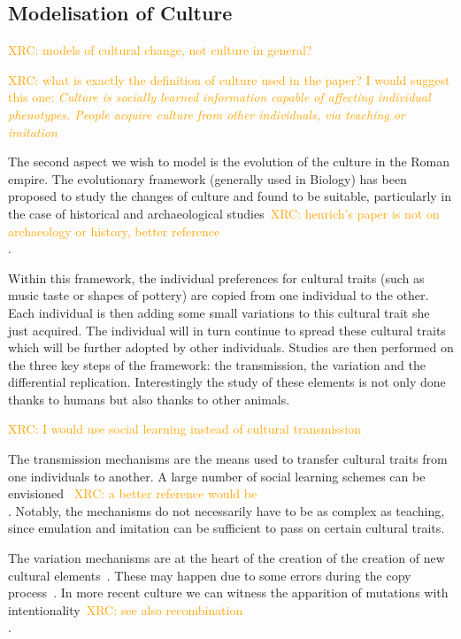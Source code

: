 \documentclass{wscpaperproc}
\newcommand{\memo}[2]{\textcolor{#1}{#2}}
\newcommand{\xrc}[1]{\memo{orange}{XRC: #1\\}}
\begin{document}
\subsection{Modelisation of Culture}

\xrc{models of cultural change, not culture in general?}

\xrc{what is exactly the definition of culture used in the paper? I would suggest this one: \emph{Culture is socially learned information capable of affecting  individual phenotypes. People acquire culture from other  individuals, via teaching or imitation} \cite{richerson1996}}

The second aspect we wish to model is the evolution of the culture in the Roman empire. The evolutionary framework (generally used in Biology) has been proposed to study the changes of culture and found to be suitable,  particularly in the case of historical and archaeological studies~\cite{lycett_cultural_2015,henrich_evolution_2003}\xrc{henrich's paper is not on archaeology or history, better reference \cite{shennan_2008}}.

Within this framework, the individual preferences for cultural traits (such as music taste or shapes of pottery) are copied from one individual to the other. Each individual is then adding some small variations to this cultural trait she just acquired. The individual will in turn continue to spread these cultural traits which will be further adopted by other individuals. Studies are then performed on the three key steps of the framework: the transmission, the variation and the differential replication. Interestingly the study of these elements is not only done thanks to humans but also thanks to other animals.

\xrc{I would use social learning instead of cultural transmission}

The transmission mechanisms are the means used to transfer cultural traits from one individuals to another. A large number of social learning schemes can be envisioned~\cite{heyes_social_1994} \xrc{a better reference would be \cite{henrich_evolution_2003}}. Notably, the mechanisms do not necessarily have to be as complex as teaching, since emulation and imitation can be sufficient to pass on certain cultural traits.

The variation mechanisms are at the heart of the creation of the creation of new cultural elements~\cite{obrien_variation_1990}. These may happen due to some errors during the copy process~\cite{schillinger_copying_2014}. In more recent culture we can witness the apparition of mutations with intentionality~\cite{ziman_technological_2003}\xrc{see also recombination \cite{sole_2013}}.
\end{document}
